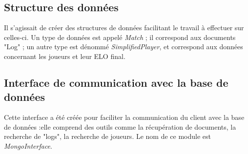 \subsection{Structure des données}
Il s'agissait de créer des structures de données facilitant le travail à effectuer sur celles-ci. Un type de données est appelé \textit{Match} ; il correspond aux documents "Log" ; un autre type est dénommé \textit{SimplifiedPlayer}, et correspond aux données concernant les joueurs et leur ELO final. 



\subsection{Interface de communication avec la base de données}
Cette interface a été créée pour faciliter la communication du client avec la base de données :elle comprend des outils comme la récupération de documents, la recherche de "logs", la recherche de joueurs. Le nom de ce module est \textit{MongoInterface}.

